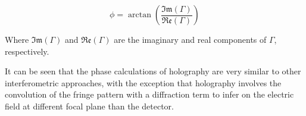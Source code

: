 \documentclass[10pt,letterpaper]{article}
\begin{document}
 \begin{equation}
 \phi=\arctan\left(\frac{\mathfrak{Im}(\Gamma)}{\mathfrak{Re}(\Gamma)}\right)
 \end{equation}
 
 Where $\mathfrak{Im}(\Gamma)$ and $\mathfrak{Re}(\Gamma)$ are the imaginary and real components of $\Gamma$, respectively.\par
 
   It can be seen that the phase calculations of holography are very similar to other interferometric approaches, with the exception that holography involves the convolution of the fringe pattern with a diffraction term to infer on the electric field at different focal plane than the detector.







\end{document}
